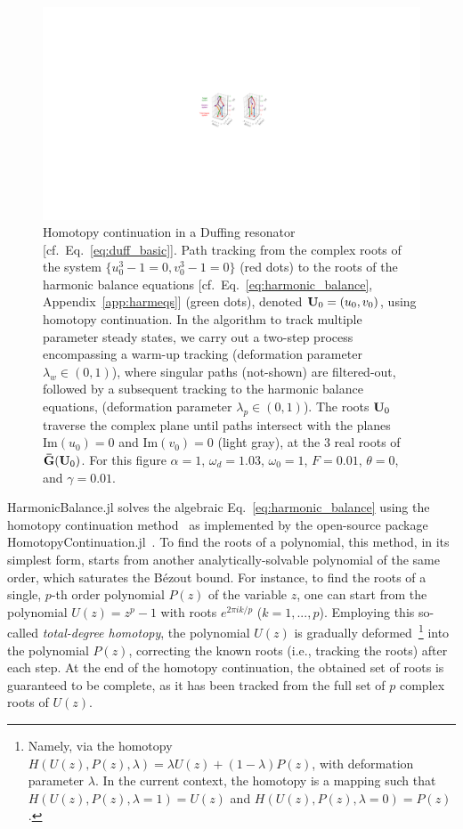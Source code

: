 \begin{figure}[t]
	\centering
	\includegraphics[width=\textwidth]{figures/hb/hb_paths.pdf}
	\caption{Homotopy continuation in a Duffing resonator [cf.~Eq.~\eqref{eq:duff_basic}]. Path tracking from the complex roots of the system $\{u_0^3-1=0,v_0^3-1=0\}$ (red dots) to the roots of the harmonic balance equations [cf.~Eq.~\eqref{eq:harmonic_balance}, Appendix~\ref{app:harmeqs}] (green dots), denoted $\vb{U}_0=(u_0,v_0)$, using homotopy continuation.  In the algorithm to track multiple parameter steady states, we carry out a two-step process encompassing a warm-up tracking (deformation parameter $\lambda_w\in(0,1)$), where singular paths (not-shown) are filtered-out, followed by a subsequent tracking to the harmonic balance equations, (deformation parameter $\lambda_p\in(0,1)$).  The roots $\vb{U}_0$ traverse the complex plane until paths intersect with the planes $\mathrm{Im}(u_0)=0$ and $\mathrm{Im}(v_0)=0$ (light gray), at the 3 real  roots of $\vb{\bar{G}}(\vb{U}_0)$. For this figure $\alpha=1$, $\omega_d=1.03$, $\omega_0=1$, $F=0.01$, $\theta=0$, and $\gamma=0.01$.}
	\label{fig:path_track}
\end{figure} 

HarmonicBalance.jl solves the algebraic Eq.~\eqref{eq:harmonic_balance} using the homotopy continuation method~\cite{Bates_2013, Verschelde_1999} as implemented by the open-source package HomotopyContinuation.jl~\cite{Breiding_2018}. To find the roots of a polynomial, this method, in its simplest form, starts from another analytically-solvable polynomial of the same order, which saturates the Bézout bound. For instance, to find the roots of a single, $p$-th order polynomial $P(z)$ of the variable $z$, one can start from the polynomial $U(z)=z^p - 1$ with roots $e^{2\pi i k /p}$ ($k = 1,..., p$). Employing this so-called \textit{total-degree homotopy}, the polynomial $U(z)$ is gradually deformed~\footnote{Namely, via the homotopy $H(U(z),P(z),\lambda)=\lambda U(z)+(1-\lambda)P(z)$, with deformation parameter $\lambda$. In the current context, the homotopy is a mapping such that $H(U(z),P(z),\lambda=1)=U(z)$ and $H(U(z),P(z),\lambda=0)=P(z)$.} into the polynomial $P(z)$, correcting the known roots (i.e., tracking the roots) after each step. At the end of the homotopy continuation, the obtained set of roots is guaranteed to be complete, as it has been tracked from the full set of $p$ complex roots of $U(z)$.

